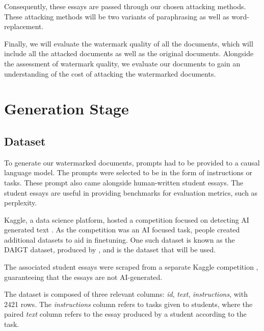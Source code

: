 \documentclass{l4proj}
\theoremstyle{definition}
\begin{document}
    Consequently, these essays are passed through our chosen attacking methods. These attacking methods will be two variants of paraphrasing as well as word-replacement. 

    Finally, we will evaluate the watermark quality of all the documents, which will include all the attacked documents as well as the original documents. Alongside the assessment of watermark quality, we evaluate our documents to gain an understanding of the cost of attacking the watermarked documents.

\section{Generation Stage}
    \subsection{Dataset}    
        To generate our watermarked documents, prompts had to be provided to a causal language model. The prompts were selected to be in the form of instructions or tasks. These prompt also came alongside human-written student essays. The student essays are useful in providing benchmarks for evaluation metrics, such as perplexity.
    
        Kaggle, a data science platform, hosted a competition focused on detecting AI generated text \citep{llm-detect-ai-generated-text}. As the competition was an AI focused task, people created additional datasets to aid in finetuning. One such dataset is known as the DAIGT dataset, produced by \citet{Paullier2023-rx}, and is the dataset that will be used.

        The associated student essays were scraped from a separate Kaggle competition \citep{feedback-prize-english-language-learning}, guaranteeing that the essays are not AI-generated.

        The dataset is composed of three relevant columns: \emph{id}, \emph{text}, \emph{instructions}, with 2421 rows. The \emph{instructions} column refers to tasks given to students, where the paired \emph{text} column refers to the essay produced by a student according to the task.
\end{document}
